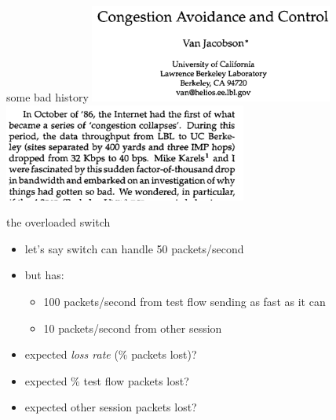 \begin{frame}{some bad history}
\includegraphics[width=0.6\textwidth]{../congest/jacobson-title}
\includegraphics[width=0.6\textwidth]{../congest/jacobson-disaster}
\end{frame}

\begin{frame}{the overloaded switch}
\begin{itemize}
\item let's say switch can handle 50 packets/second
\item but has:
    \begin{itemize}
    \item 100 packets/second from test flow sending as fast as it can
    \item 10 packets/second from other session
    \end{itemize}
\item expected \textit{loss rate} (\% packets lost)?
\item expected \% test flow packets lost?
\item expected other session packets lost?
\end{itemize}
\end{frame}


